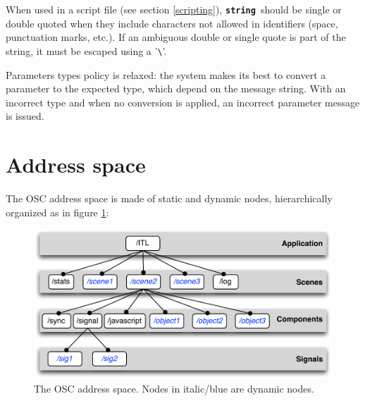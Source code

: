 \documentclass[a4paper,twoside]{report}
\newcommand{\sublevel}[1]	{\section{#1}}
\newcommand{\osctype}[1]	{\textbf{\texttt{{\small #1}}}}
\newcommand{\oscstring}		{\osctype{string}}
\begin{document}
When used in a script file (see section \ref{scripting}), \oscstring\ should be single or double quoted when they include characters not allowed in identifiers (space, punctuation marks, etc.).
If an ambiguous double or single quote is part of the string, it must be escaped using a '\verb+\+'.

Parameters types policy is relaxed: the system makes its best to convert a parameter to the expected type, which depend on the message string. With an incorrect type and when no conversion is applied, an incorrect parameter message is issued.

\sublevel{Address space}
The OSC address space is made of static and dynamic nodes, hierarchically organized as in figure \ref{fig:addrspace}:

\begin{figure}[h]
	\centering \includegraphics[width=120mm]{imgs/address_space}
 \caption{The OSC address space. Nodes in italic/blue are dynamic nodes.}
 \label{fig:addrspace}
\end{figure}
\end{document}
